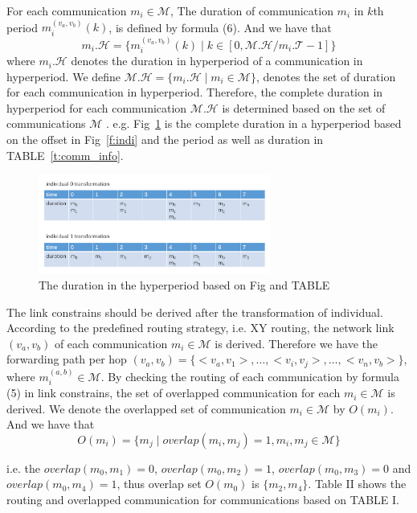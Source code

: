 \documentclass[journal]{IEEEtran}
\begin{document}
For each communication $m_{i}\in \mathcal{M}$, The duration of communication $m_{i}$ in $\mathit{k}$th period ${m_{i}^{(v_{a},v_{b})}}(k)$, is defined by formula (6). And we have that
\begin{equation}
m_{i}.\mathcal{H} = \{ {m_{i}^{(v_{a},v_{b})}}(k) \mid k \in [0, \mathcal{M.H} / m_{i}.\mathcal{T} - 1] \}
\end{equation}
where $m_{i}.\mathcal{H}$ denotes the duration in hyperperiod of a communication in hyperperiod.
We define $\mathcal{M.H}=\{ m_{i}.\mathcal{H} \mid m_{i}\in \mathcal{M} \}$, denotes the set of duration for each communication in hyperperiod. 
Therefore, the complete duration in hyperperiod for each communication $\mathcal{M.H}$ is determined based on the set of communications $\mathcal{M}$ . e.g. Fig~\ref{f:duration} is the complete duration in a hyperperiod based on the offset in Fig~\ref{f:indi} and the period as well as duration in TABLE~\ref{t:comm_info}.

\begin{figure}[!t]
	\centering
	\includegraphics[width=3in]{picture/individual_transformation.pdf}
	\caption{The duration in the hyperperiod based on Fig and TABLE}
	\label{f:duration}
\end{figure}

The link constrains should be derived after the transformation of individual. According to the predefined routing strategy, i.e. XY routing, the network link $(v_{a},v_{b})$ of each communication $m_{i}\in\mathcal{M}$ is derived. Therefore we have the forwarding path per hop $ (v_{a},v_{b})=\{ <v_{a},v_{1}> ,\dots, <v_{i},v_{j}> ,\dots, <v_{n},v_{b}> \} $, where $m_{i}^{(a,b)}\in\mathcal{M}$. By checking the routing of each communication by formula (5) in link constrains, the set of overlapped communication for each $m_{i}\in\mathcal{M}$ is derived. We denote the overlapped set of communication $m_{i}\in \mathcal{M}$ by $O(m_i)$. And we have that
\begin{equation}
	O(m_i) = \{ m_j \mid overlap(m_i,m_j)=1,m_i,m_j\in\mathcal{M}  \}
\end{equation}

 i.e. the $overlap(m_{0},m_{1})=0$, $overlap(m_{0},m_{2})=1$, $overlap(m_{0},m_{3})=0$ and $overlap(m_{0},m_{4})=1$, thus overlap set $O(m_{0})$ is $\{ m_{2},m_{4} \}$. Table II shows the routing and overlapped communication for communications based on TABLE I.
\end{document}
